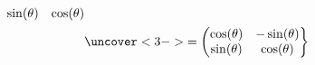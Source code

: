 \begin{frame}[fragile]
\begin{columns}
\begin{column}{0.5\textwidth}
\begin{align*}
{\begin{matrix}
                    \sin(\theta) & \cos(\theta)
                \end{matrix}}\\
                &\uncover<3->{= \left(\begin{matrix}
                    \cos(\theta) & -\sin(\theta)\\
                    \sin(\theta) & \cos(\theta)
                \end{matrix}\right\}}
            \end{align*}
        \end{column}
    \end{columns}
\end{frame}


